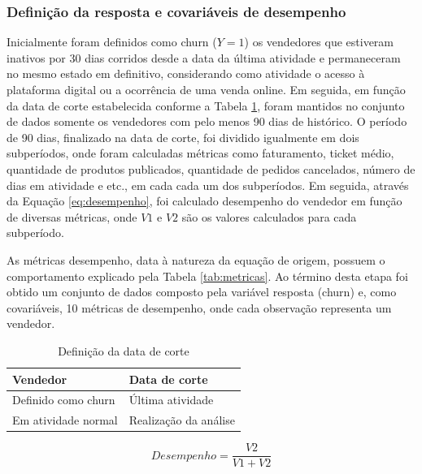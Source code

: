 \documentclass[twocolumn]{rbef}
\newcommand{\1}{\mathbbm{1}}
\begin{document}
\hypertarget{definiuxe7uxe3o-da-resposta-e-covariuxe1veis-de-desempenho}{%
\subsubsection{Definição da resposta e covariáveis de desempenho}\label{definiuxe7uxe3o-da-resposta-e-covariuxe1veis-de-desempenho}}

Inicialmente foram definidos como churn (\(Y=1\)) os vendedores que estiveram inativos por 30 dias corridos desde a data da última atividade e permaneceram no mesmo estado em definitivo, considerando como atividade o acesso à plataforma digital ou a ocorrência de uma venda online. Em seguida, em função da data de corte estabelecida conforme a Tabela \ref{tab:dataDeCorte}, foram mantidos no conjunto de dados somente os vendedores com pelo menos 90 dias de histórico. O período de 90 dias, finalizado na data de corte, foi dividido igualmente em dois subperíodos, onde foram calculadas métricas como faturamento, ticket médio, quantidade de produtos publicados, quantidade de pedidos cancelados, número de dias em atividade e etc., em cada cada um dos subperíodos. Em seguida, através da Equação \eqref{eq:desempenho}, foi calculado desempenho do vendedor em função de diversas métricas, onde \(V1\) e \(V2\) são os valores calculados para cada subperíodo.

As métricas desempenho, data à natureza da equação de origem, possuem o comportamento explicado pela Tabela \ref{tab:metricas}. Ao término desta etapa foi obtido um conjunto de dados composto pela variável resposta (churn) e, como covariáveis, 10 métricas de desempenho, onde cada observação representa um vendedor.

\begin{table}

\caption{\label{tab:dataDeCorte}Definição da data de corte}
\centering
\fontsize{10}{12}\selectfont
\begin{tabular}[t]{ll}
\toprule
Vendedor & Data de corte\\
\midrule
Definido como churn & Última atividade\\
Em atividade normal & Realização da análise\\
\bottomrule
\end{tabular}
\end{table}

\begin{equation}
Desempenho = \dfrac{V2}{V1+V2} \label{eq:desempenho}
\end{equation}
\end{document}

